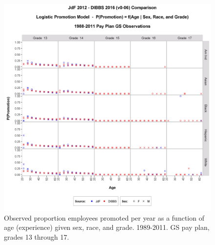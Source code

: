 \documentclass[10pt, letterpaper]{article}
\begin{document}
\begin{spacing}{1.0}
\begin{figure}[]
    \centering
    \includegraphics[width=6in, trim={0 0 0 1in}, clip]{PromotionSexRaceageGS13-17Observed.png}
    \caption{Observed proportion employees promoted per year as a function of age (experience) given sex, race, and grade.  1989-2011.  GS pay plan, grades 13 through 17.}
    \label{figure:PromotionSexRaceageGS13-17Observed}
\end{figure}

\clearpage


\end{spacing}
\end{document}
